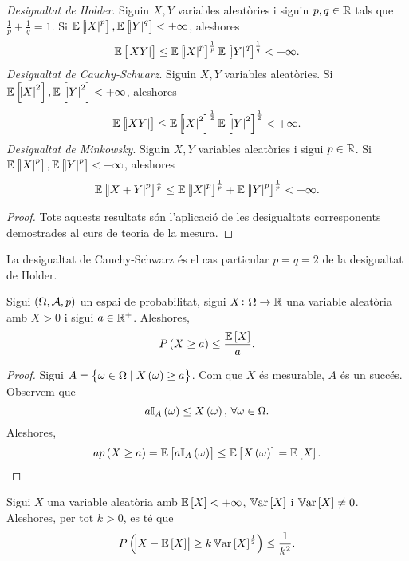 \begin{prop}
    \textit{Desigualtat de Holder}. Siguin $X,Y$ variables aleatòries i siguin $p,q\in\mathbb{R}$ tals que $\frac{1}{p}+\frac{1}{q}=1$. Si $\operatorname{\mathbb{E}}\left[\abs{X}^p\right],\operatorname{\mathbb{E}}\left[\abs{Y}^q\right]<+\infty$, aleshores
    \[
        \operatorname{\mathbb{E}}\left[\abs{XY}\right]\leq\operatorname{\mathbb{E}}\left[\abs{X}^p\right]^{\frac{1}{p}}\operatorname{\mathbb{E}}\left[\abs{Y}^q\right]^{\frac{1}{q}}<+\infty.
    \]
    \textit{Desigualtat de Cauchy-Schwarz}. Siguin $X,Y$ variables aleatòries. Si $\operatorname{\mathbb{E}}\left[\abs{X}^2\right],\operatorname{\mathbb{E}}\left[\abs{Y}^2\right]<+\infty$, aleshores
    \[
        \operatorname{\mathbb{E}}\left[\abs{XY}\right]\leq\operatorname{\mathbb{E}}\left[\abs{X}^2\right]^{\frac{1}{2}}\operatorname{\mathbb{E}}\left[\abs{Y}^2\right]^{\frac{1}{2}}<+\infty.
    \]
    \textit{Desigualtat de Minkowsky}. Siguin $X,Y$ variables aleatòries i sigui $p\in\mathbb{R}$. Si $\operatorname{\mathbb{E}}\left[\abs{X}^p\right],\operatorname{\mathbb{E}}\left[\abs{Y}^p\right]<+\infty$, aleshores
    \[
        \operatorname{\mathbb{E}}\left[\abs{X+Y}^p\right]^{\frac{1}{p}}\leq\operatorname{\mathbb{E}}\left[\abs{X}^p\right]^{\frac{1}{p}}+\operatorname{\mathbb{E}}\left[\abs{Y}^p\right]^{\frac{1}{p}}<+\infty.
    \]
\end{prop}
\begin{proof}
    Tots aquests resultats són l'aplicació de les desigualtats corresponents demostrades al curs de teoria de la mesura.
\end{proof}
\begin{obs}
    La desigualtat de Cauchy-Schwarz és el cas particular $p=q=2$ de la desigualtat de Holder.
\end{obs}
\begin{specialteo}
    Sigui $\left(\Omega,\mathcal{A},p\right)$ un espai de probabilitat, sigui $X\colon\Omega\to\mathbb{R}$ una variable aleatòria amb $X>0$ i sigui $a\in\mathbb{R}^+$. Aleshores,
    \[
        P\left( X\geq a\right) \leq \frac{\operatorname{\mathbb{E}}\left[ X\right]}{a}.
    \]
\end{specialteo}
\begin{proof}
    Sigui $A=\left\{ \omega\in\Omega\mid X\left(\omega\right)\geq a\right\}$. Com que $X$ és mesurable, $A$ és un succés. Observem que
    \[
        a\mathbb{I}_A\left(\omega\right)\leq X\left(\omega\right),\,\forall\omega\in\Omega.
    \]
    Aleshores,
    \[
        ap\left( X\geq a\right) = \operatorname{\mathbb{E}}\left[ a\mathbb{I}_A\left(\omega\right)\right] \leq \operatorname{\mathbb{E}}\left[ X\left(\omega\right)\right] = \operatorname{\mathbb{E}}\left[ X\right].
    \]
\end{proof}
\begin{specialteo}
    Sigui $X$ una variable aleatòria amb $\operatorname{\mathbb{E}}\left[ X\right]<+\infty$, $\operatorname{\mathbb{V}ar}\left[ X\right]$ i $\operatorname{\mathbb{V}ar}\left[ X\right]\neq 0$. Aleshores, per tot $k>0$, es té que
    \[
        P\left( \abs{X-\operatorname{\mathbb{E}}\left[ X\right]}\geq k\operatorname{\mathbb{V}ar}\left[ X\right]^{\frac{1}{2}}\right)\leq\frac{1}{k^2}.
    \]
\end{specialteo}
